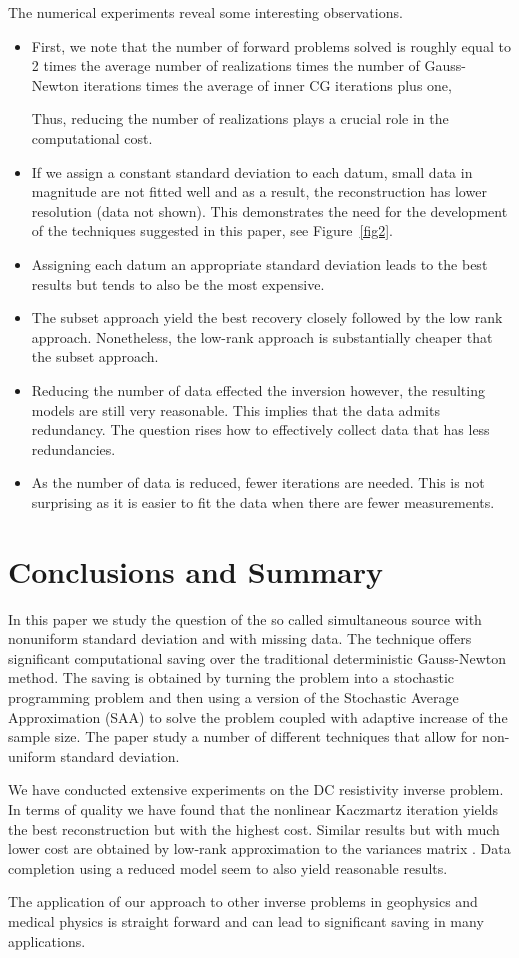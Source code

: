 \documentclass[12pt]{article}
\begin{document}
The numerical experiments reveal some interesting observations.
\begin{itemize}
\item First, we note that the number of forward problems solved is roughly equal to 2 times the average number of realizations times the number of Gauss-Newton iterations times the average of inner CG iterations plus one,

Thus, reducing the number of realizations plays a crucial role in the computational cost.
\item If we assign a constant standard deviation to each datum, small  data in magnitude are not fitted well and as a result, the reconstruction has lower resolution (data not shown). This demonstrates the need for the development of the techniques suggested in this paper, see Figure~\ref{fig2}.
\item
Assigning each datum an appropriate standard deviation leads to the best results but tends
to also be the most expensive.
\item The  subset approach    yield the best recovery closely followed by the  low rank approach.
Nonetheless, the low-rank approach is substantially cheaper that the subset approach.
\item Reducing the number of data  effected the inversion however, the resulting models are
still very reasonable. This implies that the data admits redundancy. The question rises how to effectively
collect data that has less redundancies.
\item As the number of data is reduced, fewer iterations are needed. This is not surprising as it is
easier to fit the data when there are fewer measurements.
\end{itemize}


\section{Conclusions and Summary}
\label{sec5}

 In this paper we study the question of the so called simultaneous source with nonuniform standard deviation
 and with missing data. The technique offers significant computational saving over the traditional
 deterministic Gauss-Newton method. The saving is obtained by turning the problem into a stochastic
programming problem and then using a version of the Stochastic Average Approximation (SAA) to solve
the problem coupled with adaptive increase of the sample size. The paper study a number of different
techniques that allow for non-uniform standard deviation.

We have conducted extensive experiments on the DC resistivity inverse problem.
In terms of quality we have found that the nonlinear Kaczmartz iteration yields the best reconstruction
but with the highest cost. Similar results but with much lower cost are obtained by low-rank approximation to the variances matrix . Data completion using a reduced model seem to also yield reasonable results.

The application of our approach to other inverse problems in geophysics and medical physics is straight
forward and can lead to significant saving in many applications.



\end{document}
